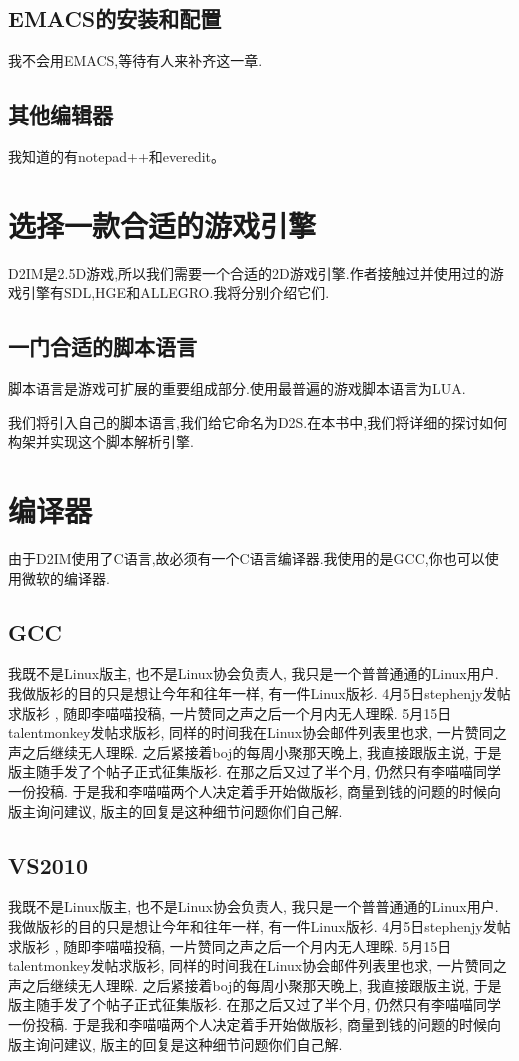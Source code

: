 \subsection{EMACS的安装和配置}
我不会用EMACS,等待有人来补齐这一章.

\subsection{其他编辑器}
我知道的有notepad++和everedit。
\section{选择一款合适的游戏引擎}
D2IM是2.5D游戏,所以我们需要一个合适的2D游戏引擎.作者接触过并使用过的游戏引擎有SDL,HGE和ALLEGRO.我将分别介绍它们.

\subsection{一门合适的脚本语言}
脚本语言是游戏可扩展的重要组成部分.使用最普遍的游戏脚本语言为LUA.

我们将引入自己的脚本语言,我们给它命名为D2S.在本书中,我们将详细的探讨如何构架并实现这个脚本解析引擎.




\section{编译器}
由于D2IM使用了C语言,故必须有一个C语言编译器.我使用的是GCC,你也可以使用微软的编译器.
\subsection{GCC}
我既不是Linux版主, 也不是Linux协会负责人, 我只是一个普普通通的Linux用户. 我做版衫的目的只是想让今年和往年一样, 有一件Linux版衫. 4月5日stephenjy发帖求版衫 , 随即李喵喵投稿, 一片赞同之声之后一个月内无人理睬. 5月15日talentmonkey发帖求版衫, 同样的时间我在Linux协会邮件列表里也求, 一片赞同之声之后继续无人理睬. 之后紧接着boj的每周小聚那天晚上, 我直接跟版主说, 于是版主随手发了个帖子正式征集版衫. 在那之后又过了半个月, 仍然只有李喵喵同学一份投稿. 于是我和李喵喵两个人决定着手开始做版衫, 商量到钱的问题的时候向版主询问建议, 版主的回复是这种细节问题你们自己解.
\subsection{VS2010}
我既不是Linux版主, 也不是Linux协会负责人, 我只是一个普普通通的Linux用户. 我做版衫的目的只是想让今年和往年一样, 有一件Linux版衫. 4月5日stephenjy发帖求版衫 , 随即李喵喵投稿, 一片赞同之声之后一个月内无人理睬. 5月15日talentmonkey发帖求版衫, 同样的时间我在Linux协会邮件列表里也求, 一片赞同之声之后继续无人理睬. 之后紧接着boj的每周小聚那天晚上, 我直接跟版主说, 于是版主随手发了个帖子正式征集版衫. 在那之后又过了半个月, 仍然只有李喵喵同学一份投稿. 于是我和李喵喵两个人决定着手开始做版衫, 商量到钱的问题的时候向版主询问建议, 版主的回复是这种细节问题你们自己解.

